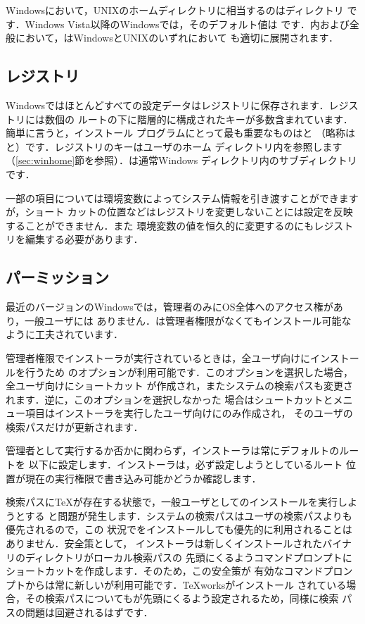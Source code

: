 \documentclass[uplatex,dvipdfmx,tombow]{jsarticle}
\begin{document}
Windowsにおいて，UNIXのホームディレクトリに相当するのはディレクトリ
です．Windows Vista以降のWindowsでは，そのデフォルト値は%
です．内および\KPS 全般において，\dir{~}はWindowsとUNIXのいずれにおいて
も適切に展開されます．

\subsection{レジストリ}
\label{sec:registry}

Windowsではほとんどすべての設定データはレジストリに保存されます．レジストリには数個の
ルートの下に階層的に構成されたキーが多数含まれています．簡単に言うと，インストール
プログラムにとって最も重要なものはと%
（略称はと）です．レジストリのキーはユーザのホーム
ディレクトリ内を参照します（\ref{sec:winhome}節を参照）．は通常Windows%
ディレクトリ内のサブディレクトリです．

一部の項目については環境変数によってシステム情報を引き渡すことができますが，ショート
カットの位置などはレジストリを変更しないことには設定を反映することができません．また
環境変数の値を恒久的に変更するのにもレジストリを編集する必要があります．

\subsection{パーミッション}
\label{sec:winpermissions}

最近のバージョンのWindowsでは，管理者のみにOS全体へのアクセス権があり，一般ユーザには
ありません．\TL は管理者権限がなくてもインストール可能なように工夫されています．

管理者権限でインストーラが実行されているときは，全ユーザ向けにインストールを行うため
のオプションが利用可能です．このオプションを選択した場合，全ユーザ向けにショートカット
が作成され，またシステムの検索パスも変更されます．逆に，このオプションを選択しなかった
場合はシュートカットとメニュー項目はインストーラを実行したユーザ向けにのみ作成され，
そのユーザの検索パスだけが更新されます．

管理者として実行するか否かに関わらず，インストーラは常にデフォルトの\TL ルートを
以下に設定します．インストーラは，必ず設定しようとしているルート
位置が現在の実行権限で書き込み可能かどうか確認します．

検索パスに\TeX が存在する状態で，一般ユーザとして\TL のインストールを実行しようとする
と問題が発生します．システムの検索パスはユーザの検索パスよりも優先されるので，この
状況で\TL をインストールしても優先的に利用されることはありません．安全策として，
インストーラは新しくインストールされた\TL バイナリのディレクトリがローカル検索パスの
先頭にくるようコマンドプロンプトにショートカットを作成します．そのため，この安全策が
有効なコマンドプロンプトからは常に新しい\TL が利用可能です．\TeX worksがインストール
されている場合，その検索パスについても\TL が先頭にくるよう設定されるため，同様に検索
パスの問題は回避されるはずです．
\end{document}
